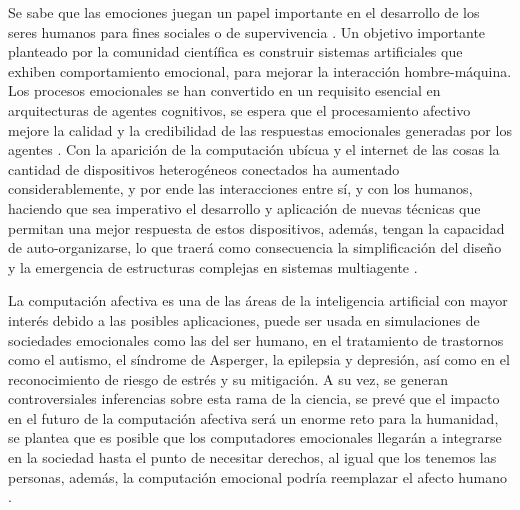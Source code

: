 %
%
%

\introduccion

Se sabe que las emociones juegan un papel importante en el desarrollo de los
seres humanos para fines sociales o de supervivencia \citep{cuevas2015, rodriguez2015}.
Un objetivo importante planteado por la comunidad científica es
construir sistemas artificiales que exhiben comportamiento emocional, para
mejorar la interacción hombre-máquina. Los procesos emocionales se han
convertido en un requisito esencial en arquitecturas de agentes cognitivos, se
espera que el procesamiento afectivo mejore la calidad y la credibilidad de las
respuestas emocionales generadas por los agentes \citep{rodriguez2015}. Con
la aparición de la computación ubícua \citep{weiser1993} y el internet de las
cosas \citep{ashton2009} la cantidad de dispositivos heterogéneos conectados ha
aumentado considerablemente, y por ende las interacciones entre sí, y con los
humanos, haciendo que sea imperativo el desarrollo y aplicación de nuevas
técnicas que permitan una mejor respuesta de estos dispositivos, además,
tengan la capacidad de auto-organizarse, lo que traerá como consecuencia la
simplificación del diseño y la emergencia de estructuras complejas en sistemas
multiagente \citep{perozo2011}.

La computación afectiva es una de las áreas de la inteligencia artificial con
mayor interés debido a las posibles aplicaciones, puede ser usada en
simulaciones de sociedades emocionales como las del ser humano, en el
tratamiento de trastornos como el autismo, el síndrome de Asperger, la
epilepsia y depresión, así como en el reconocimiento de riesgo de estrés y su
mitigación. A su vez, se generan controversiales inferencias
sobre esta rama de la ciencia, se prevé que el impacto en el futuro de la
computación afectiva será un enorme reto para la humanidad, se plantea que es
posible que los computadores emocionales llegarán a integrarse en la sociedad
hasta el punto de necesitar derechos, al igual que los tenemos las personas,
además, la computación emocional podría reemplazar el afecto humano \citep{cuevas2015}.

